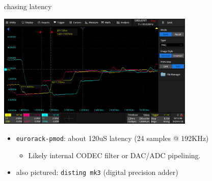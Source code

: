 \documentclass[aspectratio=169]{beamer}
\begin{document}

\begin{frame}{chasing latency}
    \begin{center}
        \includegraphics[height=5.5cm]{img/latency_scope1.png}
    \end{center}
    \begin{itemize}
        \item \texttt{eurorack-pmod}: about 120uS latency (24 samples @ 192KHz)
        \begin{itemize}
            \item Likely internal CODEC filter or DAC/ADC pipelining.
        \end{itemize}
        \item also pictured: \texttt{disting mk3} (digital precision adder)
    \end{itemize}
\end{frame}


\end{document}
